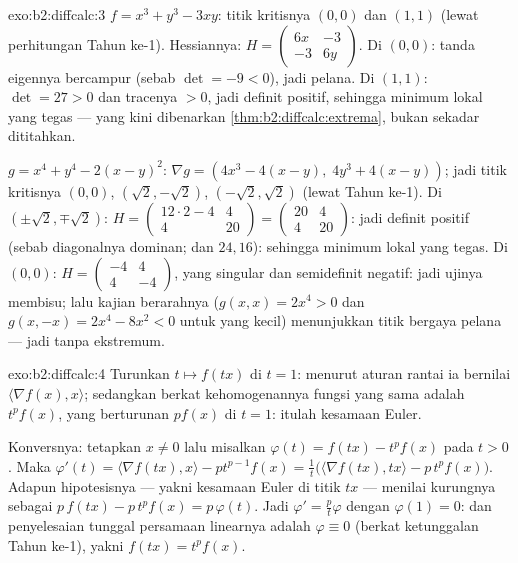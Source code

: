 \begin{solution}{exo:b2:diffcalc:3}
$f = x^3 + y^3 - 3xy$: titik kritisnya $(0,0)$ dan $(1,1)$ (lewat
perhitungan Tahun ke-1). Hessiannya: $H = \begin{pmatrix} 6x & -3\\ -3 &
6y\end{pmatrix}$. Di $(0,0)$: tanda eigennya bercampur (sebab $\det = -9 < 0$),
jadi pelana. Di $(1,1)$: $\det = 27 > 0$ dan tracenya $> 0$, jadi definit
positif, sehingga minimum lokal yang tegas --- yang kini dibenarkan
\cref{thm:b2:diffcalc:extrema}, bukan sekadar dititahkan.

$g = x^4 + y^4 - 2(x-y)^2$: $\nabla g = (4x^3 - 4(x - y),\; 4y^3 +
4(x-y))$; jadi titik kritisnya $(0,0)$, $(\sqrt2, -\sqrt2)$,
$(-\sqrt2, \sqrt2)$ (lewat Tahun ke-1). Di $(\pm\sqrt2, \mp\sqrt2)$: $H =
\begin{pmatrix} 12\cdot2 - 4 & 4\\ 4 & 20\end{pmatrix} =
\begin{pmatrix} 20 & 4\\ 4 & 20\end{pmatrix}$: jadi definit positif
(sebab diagonalnya dominan; dan  $24, 16$): sehingga minimum lokal yang tegas.
Di $(0,0)$: $H = \begin{pmatrix} -4 & 4\\ 4 & -4\end{pmatrix}$, yang
singular dan semidefinit negatif: jadi ujinya membisu; lalu kajian
berarahnya ($g(x,x) = 2x^4 > 0$ dan $g(x,-x) = 2x^4 - 8x^2 < 0$ untuk yang kecil)
menunjukkan titik bergaya pelana --- jadi tanpa ekstremum.
\end{solution}

\begin{solution}{exo:b2:diffcalc:4}
Turunkan $t \mapsto f(tx)$ di $t = 1$: menurut aturan rantai ia bernilai
$\langle \nabla f(x), x\rangle$; sedangkan berkat kehomogenannya fungsi yang sama
adalah $t^pf(x)$, yang berturunan $pf(x)$ di $t = 1$: itulah kesamaan Euler.

Konversnya: tetapkan $x \neq 0$ lalu misalkan $\varphi(t) = f(tx) - t^p f(x)$
pada $t > 0$. Maka $\varphi'(t) = \langle\nabla f(tx), x\rangle -
pt^{p-1}f(x) = \frac1t\bigl(\langle \nabla f(tx), tx\rangle -
p\,t^pf(x)\bigr)$. Adapun hipotesisnya --- yakni kesamaan Euler di titik
$tx$ --- menilai kurungnya sebagai $p\,f(tx) - p\,t^pf(x) =
p\,\varphi(t)$. Jadi $\varphi' = \frac{p}{t}\varphi$ dengan $\varphi(1)
= 0$: dan penyelesaian tunggal persamaan  linearnya adalah $\varphi \equiv 0$ (berkat
ketunggalan Tahun ke-1), yakni $f(tx) = t^pf(x)$.
\end{solution}

